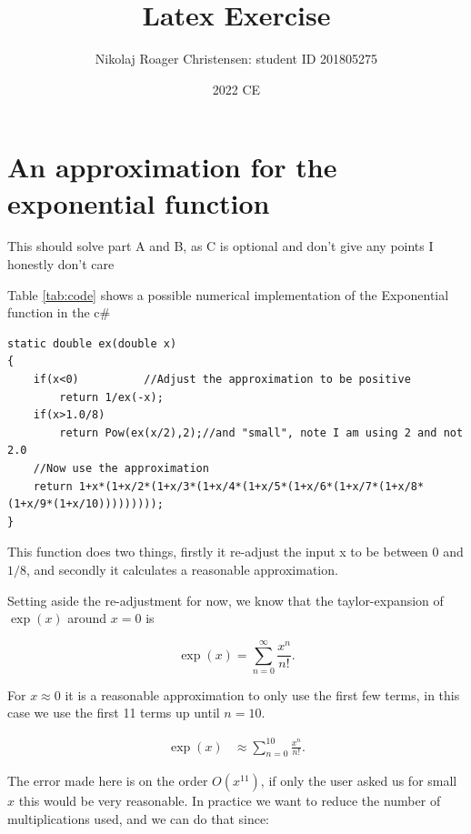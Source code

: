\documentclass[a4paper,12pt,article]{memoir}
\title{Latex Exercise}
\author{Nikolaj Roager Christensen: student ID 201805275}
\date{2022 CE} %
\begin{document}
\maketitle

\chapter*{An approximation for the exponential function}
This should solve part A and B, as C is optional and don't give any points I honestly don't care

Table \ref{tab:code} shows a possible numerical implementation of the Exponential function in the c\#


\begin{table}
\begin{lstlisting}
static double ex(double x)
{
    if(x<0)          //Adjust the approximation to be positive
        return 1/ex(-x);
    if(x>1.0/8)
        return Pow(ex(x/2),2);//and "small", note I am using 2 and not 2.0
    //Now use the approximation
    return 1+x*(1+x/2*(1+x/3*(1+x/4*(1+x/5*(1+x/6*(1+x/7*(1+x/8*(1+x/9*(1+x/10)))))))));
}
\end{lstlisting}
\caption{A simple approximation of the exponential function, using only multiplication and division (the mono c\# compiler do interpret \lstinline{System.Math.Pow(double,int)} as a list of mulitiplications). }
\label{tab:code}
\end{table}


This function does two things, firstly it re-adjust the input x to be between 0 and $1/8$, and secondly it calculates a reasonable approximation.

Setting aside the re-adjustment for now, we know that the taylor-expansion of $\exp(x)$ around $x=0$ is

\begin{equation}
\exp(x) = \sum_{n=0}^\infty \frac{x^n}{n!}.
\end{equation}

For $x\approx 0$ it is a reasonable approximation to only use the first few terms, in this case we use the first 11 terms up until $n=10$.

\begin{align}
\exp(x) &\approx \sum_{n=0}^{10} \frac{x^n}{n!}.
\end{align}

The error made here is on the order $O(x^{11})$, if only the user asked us for small $x$ this would be very reasonable. In practice we want to reduce the number of multiplications used, and we can do that since:
\end{document}
